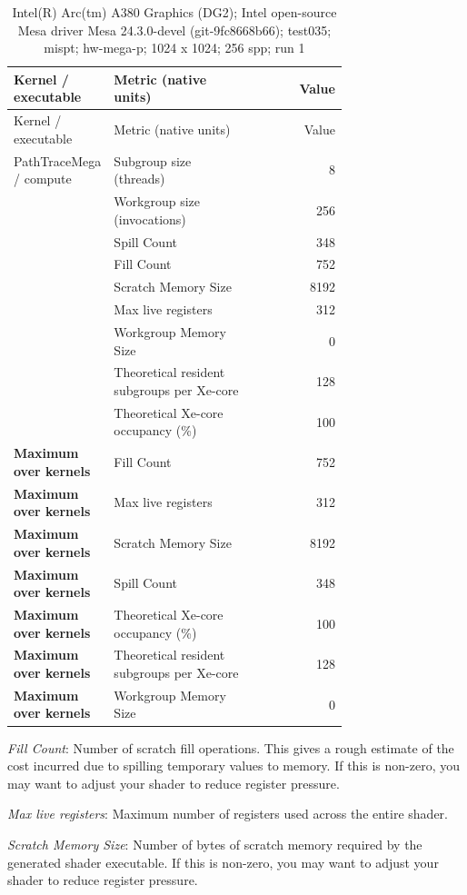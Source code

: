 \begin{longtable}{p{0.30\linewidth}p{0.43\linewidth}r}
\caption{Intel(R) Arc(tm) A380 Graphics (DG2); Intel open-source Mesa driver Mesa 24.3.0-devel (git-9fc8668b66); test035; mispt; hw-mega-p; 1024 x 1024; 256 spp; run 1}\label{tab:hydra-profile-0}\\
\hline Kernel / executable & Metric (native units) & Value \\\hline
\endfirsthead
\hline Kernel / executable & Metric (native units) & Value \\\hline
\endhead
PathTraceMega / compute & Subgroup size (threads) & 8 \\
 & Workgroup size (invocations) & 256 \\
 & Spill Count & 348 \\
 & Fill Count & 752 \\
 & Scratch Memory Size & 8192 \\
 & Max live registers & 312 \\
 & Workgroup Memory Size & 0 \\
 & Theoretical resident subgroups per Xe-core & 128 \\
 & Theoretical Xe-core occupancy (\%) & 100 \\
\hline
\textbf{Maximum over kernels} & Fill Count & 752 \\
\textbf{Maximum over kernels} & Max live registers & 312 \\
\textbf{Maximum over kernels} & Scratch Memory Size & 8192 \\
\textbf{Maximum over kernels} & Spill Count & 348 \\
\textbf{Maximum over kernels} & Theoretical Xe-core occupancy (\%) & 100 \\
\textbf{Maximum over kernels} & Theoretical resident subgroups per Xe-core & 128 \\
\textbf{Maximum over kernels} & Workgroup Memory Size & 0 \\
\hline
\end{longtable}
\noindent\textit{Fill Count}: Number of scratch fill operations.  This gives a rough estimate of the cost incurred due to spilling temporary values to memory.  If this is non-zero, you may want to adjust your shader to reduce register pressure.\par
\noindent\textit{Max live registers}: Maximum number of registers used across the entire shader.\par
\noindent\textit{Scratch Memory Size}: Number of bytes of scratch memory required by the generated shader executable.  If this is non-zero, you may want to adjust your shader to reduce register pressure.\par

